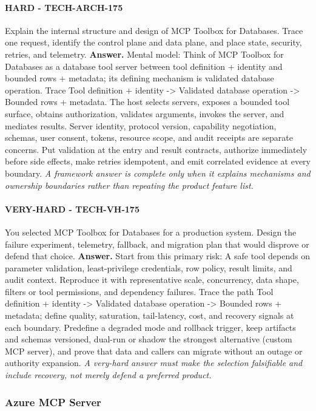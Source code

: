 \paragraph{HARD - TECH-ARCH-175} Explain the internal structure and design of MCP Toolbox for Databases. Trace one request, identify the control plane and data plane, and place state, security, retries, and telemetry.
\textbf{Answer.} Mental model: Think of MCP Toolbox for Databases as a database tool server between tool definition + identity and bounded rows + metadata; its defining mechanism is validated database operation. Trace Tool definition + identity -> Validated database operation -> Bounded rows + metadata. The host selects servers, exposes a bounded tool surface, obtains authorization, validates arguments, invokes the server, and mediates results. Server identity, protocol version, capability negotiation, schemas, user consent, tokens, resource scope, and audit receipts are separate concerns. Put validation at the entry and result contracts, authorize immediately before side effects, make retries idempotent, and emit correlated evidence at every boundary.
\textit{A framework answer is complete only when it explains mechanisms and ownership boundaries rather than repeating the product feature list.}
\paragraph{VERY-HARD - TECH-VH-175} You selected MCP Toolbox for Databases for a production system. Design the failure experiment, telemetry, fallback, and migration plan that would disprove or defend that choice.
\textbf{Answer.} Start from this primary risk: A safe tool depends on parameter validation, least-privilege credentials, row policy, result limits, and audit context. Reproduce it with representative scale, concurrency, data shape, filters or tool permissions, and dependency failures. Trace the path Tool definition + identity -> Validated database operation -> Bounded rows + metadata; define quality, saturation, tail-latency, cost, and recovery signals at each boundary. Predefine a degraded mode and rollback trigger, keep artifacts and schemas versioned, dual-run or shadow the strongest alternative (custom MCP server), and prove that data and callers can migrate without an outage or authority expansion.
\textit{A very-hard answer must make the selection falsifiable and include recovery, not merely defend a preferred product.}
\subsubsection*{Azure MCP Server}
